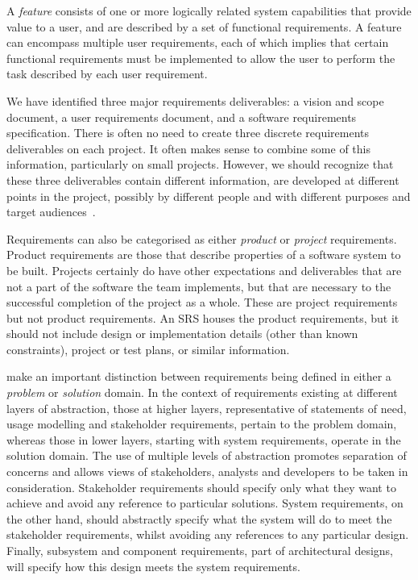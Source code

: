 \documentclass[dissertation,final]{softeng}
\begin{document}
A \emph{feature} consists of one or more logically related system capabilities that provide value to a user, and are described by a set of functional requirements. A feature can encompass multiple user requirements, each of which implies that certain functional requirements must be implemented to allow the user to perform the task described by each user requirement. %
%

We have identified three major requirements deliverables: a vision and scope document, a user requirements document, and a software requirements specification. There is often no need to create three discrete requirements deliverables on each project. It often makes sense to combine some of this information, particularly on small projects. However, we should recognize that these three deliverables contain different information, are developed at different points in the project, possibly by different people and with different purposes and target audiences~\citep{Wiegers2013}.

Requirements can also be categorised as either \emph{product} or \emph{project} requirements. Product requirements are those that describe properties of a software system to be built. Projects certainly do have other expectations and deliverables that are not a part of the software the team implements, but that are necessary to the successful completion of the project as a whole. These are project requirements but not product requirements. An SRS houses the product requirements, but it should not include design or implementation details (other than known constraints), project or test plans, or similar information.

\citet{Hull2011} make an important distinction between requirements being defined in either a \emph{problem} or \emph{solution} domain. In the context of requirements existing at different layers of abstraction, those at higher layers, representative of statements of need, usage modelling and stakeholder requirements, pertain to the problem domain, whereas those in lower layers, starting with system requirements, operate in the solution domain. The use of multiple levels of abstraction promotes separation of concerns and allows views of stakeholders, analysts and developers to be taken in consideration. Stakeholder requirements should specify only what they want to achieve and avoid any reference to particular solutions. System requirements, on the other hand, should abstractly specify what the system will do to meet the stakeholder requirements, whilst avoiding any references to any particular design. Finally, subsystem and component requirements, part of architectural designs, will specify how this design meets the system requirements.
\end{document}
